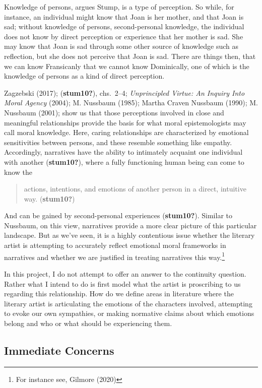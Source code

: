 \documentclass[12pt]{book}
\theoremstyle{definition}
\theoremstyle{remark}
\begin{document}
Knowledge of persons, argues Stump, is a type of perception. So while,
for instance, an individual might know that Joan is her mother, and
that Joan is sad; without knowledge of persons, second-personal knowledge, the individual does not know by direct perception or experience that her mother is sad. She may know that Joan is sad through some other source of knowledge such as reflection, but she does not perceive that Joan is sad. There are things then, that we can know Fransicanly that we cannot know Dominically, one of which is the knowledge of persons as a kind of direct perception.

Zagzebski (2017); (\textbf{stum10?}), chs.~2--4; \emph{Unprincipled {Virtue}: {An Inquiry Into Moral Agency}} (2004); M. Nussbaum (1985); Martha Craven Nussbaum (1990); M. Nussbaum (2001); show us that those perceptions involved in close and meaningful relationships provide the basis for what moral epistemologists may call moral knowledge. Here, caring relationships are characterized by emotional sensitivities between persons, and these resemble something like empathy. Accordingly, narratives have the ability to intimately acquaint one individual with another (\textbf{stum10?}), where a fully functioning human being can come to know the

\begin{quote}
actions, intentions, and emotions of another person in a direct, intuitive way. (\textbf{stum10?})
\end{quote}

\noindent And can be gained by second-personal experiences (\textbf{stum10?}). Similar to Nussbaum, on this view, narratives provide a more clear picture of this particular landscape. But as we've seen, it is a highly contentious issue whether the literary artist is attempting to accurately reflect emotional moral frameworks in narratives and whether we are justified in treating narratives this way.\footnote{For instance see, Gilmore (2020)}

\noindent In this project, I do not attempt to offer an answer to the continuity question. Rather what I intend to do is first model what the artist is proscribing to us regarding this relationship. How do we define areas in literature where the literary artist is articulating the emotions of the characters involved, attempting to evoke our own sympathies, or making normative claims about which emotions belong and who or what should be experiencing them.

\subsection*{Immediate Concerns}\label{immediate-concerns}
\end{document}
